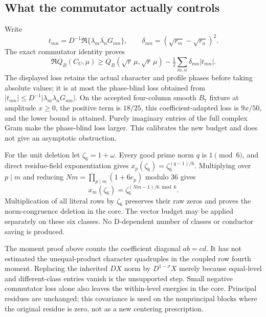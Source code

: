 \documentclass[11pt]{article}
\theoremstyle{definition}\newtheorem{definition}[theorem]{Definition}
\theoremstyle{remark}\newtheorem{remark}[theorem]{Remark}
\begin{document}
\subsection{What the commutator actually controls}
Write
\[
 t_{mn}=D^{-1}\Re\{\lambda_m\overline{\lambda_n}G_{mn}\},\qquad
 \delta_{mn}=(\sqrt{r_m}-\sqrt{r_n})^2.
\]
The exact commutator identity proves
\[
 \Re Q_B(C_U,\mu)\ge
 Q_B(\sqrt r\,\mu,\sqrt r\,\mu)
 -\tfrac12\sum_{m,n}\delta_{mn}|t_{mn}|.
\]
The displayed loss retains the actual character and profile phases before
taking absolute values; it is at most the phase-blind loss obtained from
$|t_{mn}|\le D^{-1}|\lambda_m\lambda_nG_{mn}|$.
On the accepted four-column smooth $B_7$ fixture at amplitude $x\ge0$,
the positive term is $18/25$, this coefficient-adapted loss is $9x/50$,
and the lower bound is attained. Purely imaginary entries of the full
complex Gram make the phase-blind loss larger. This calibrates the new
budget and does not give an asymptotic obstruction.

For the unit deletion let $\zeta_6=1+\omega$. Every good prime norm $q$
is $1\pmod6$, and direct residue-field exponentiation gives
$x_p(\zeta_6)=\zeta_6^{(q-1)/6}$. Multiplying over $p\mid m$ and reducing
$Nm=\prod_{p\mid m}(1+6e_p)$ modulo $36$ gives
\[
 x_m(\zeta_6)=\zeta_6^{(Nm-1)/6\bmod6}.
\]
Multiplication of all literal rows by $\zeta_6$ preserves their raw zeros
and proves the norm-congruence deletion in the core. The vector budget
may be applied separately on these six classes. No D-dependent number
of classes or conductor saving is produced.

The moment proof above counts the coefficient diagonal $ab=cd$.
It has not estimated the unequal-product character quadruples in the
coupled row fourth moment. Replacing the inherited $DX$ norm by
$D^{1-\sigma}X$ merely because equal-level and different-class entries
vanish is the unsupported step. Small negative commutator loss alone
also leaves the within-level energies in the core. Principal residues
are unchanged; this covariance is used on the nonprincipal blocks where
the original residue is zero, not as a new centering prescription.
\end{document}

